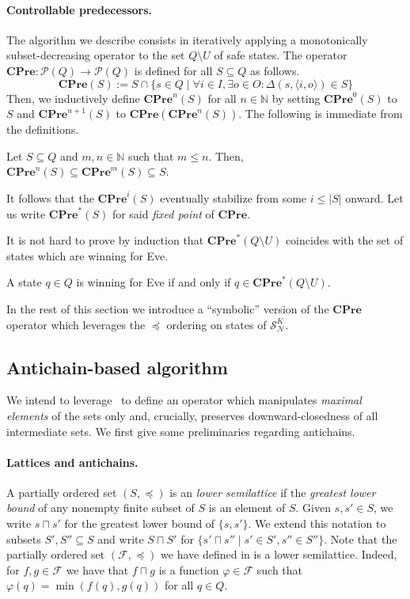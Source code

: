 \documentclass[runningheads,a4paper,draft]{llncs}
\let\phi\varphi
\newcommand{\pow}[1]{\mathcal{P}(#1)}
\newcommand{\cpre}{\mathbf{CPre}}
\newcommand{\eve}{Eve\xspace}
\newcommand{\calF}{\mathcal{F}}
\newcommand{\calN}{\mathcal{N}}
\newcommand{\calS}{\mathcal{S}}
\begin{document}
\paragraph{Controllable predecessors.} The algorithm we describe
consists in iteratively applying a monotonically subset-decreasing operator to
the set $Q \setminus U$ of safe states. The operator $\cpre\colon \pow{Q} \to
\pow{Q}$ is defined for all $S \subseteq Q$ as follows.
\[
  \cpre(S) := S \cap \{s \in Q \mid \forall i \in I, \exists o \in O :
  \Delta(s,\langle i, o \rangle) \in S\}
\]
Then, we inductively define $\cpre^n(S)$ for all $n \in \mathbb{N}$ by setting
$\cpre^0(S)$ to $S$ and $\cpre^{n+1}(S)$ to $\cpre(\cpre^{n}(S))$.
The following is immediate from the definitions.
\begin{lemma}
  Let $S \subseteq Q$ and $m, n \in \mathbb{N}$ such that $m \leq n$. Then,
  $\cpre^n(S) \subseteq \cpre^m(S) \subseteq S$.
\end{lemma}
It follows that the $\cpre^i(S)$ eventually stabilize
from some $i \leq |S|$ onward. Let us write $\cpre^*(S)$ for said \emph{fixed point}
of $\cpre$.

It is not hard to prove by induction that $\cpre^*(Q \setminus U)$ coincides with the set
of states which are winning for \eve.
\begin{proposition}
  A state $q \in Q$ is winning for \eve if and only if $q \in \cpre^*(Q
  \setminus U)$.
\end{proposition}

In the rest of this section we introduce a ``symbolic'' version of the $\cpre$
operator which leverages the $\preceq$ ordering on states of $\calS^K_\calN$.

\subsection{Antichain-based algorithm}\label{sec:antichain-algo}
We intend to leverage~ to define an operator
which manipulates \emph{maximal elements} of the sets only and, crucially,
preserves downward-closedness of all intermediate sets. We first give some
preliminaries regarding antichains.

\paragraph{Lattices and antichains.} A partially ordered set $(S, \preceq)$ is
an \emph{lower semilattice} if the \emph{greatest lower bound} of any nonempty
finite subset of $S$ is an element of $S$. Given $s,s' \in S$, we write $s
\sqcap s'$ for the greatest lower bound of $\{s,s'\}$. We extend this notation
to subsets $S', S'' \subseteq S$ and write
$S \sqcap S'$ for $\{s' \sqcap s'' \mid s' \in S', s'' \in S''\}$. 
Note that the partially ordered set $(\calF,\preceq)$ we have defined in
 is a lower semilattice. Indeed, for $f, g \in \calF$ we have
that $f \sqcap g$ is a function $\phi \in \calF$ such that
\(
  \phi(q) = \min(f(q),g(q))
\)
for all $q \in Q$.
\end{document}
